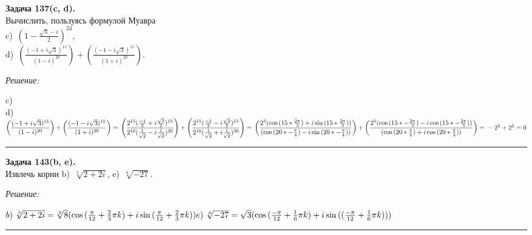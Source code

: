 \documentclass[a4paper, 12pt]{article}
\newenvironment{problem}[2][Задача]
    { \begin{mdframed}[backgroundcolor=gray!10] \textbf{#1 #2.} \\}
    {  \end{mdframed}}
\newenvironment{solution}
    {\textit{Решение: }}
    {\noindent\rule{7in}{1.5pt}}
\begin{document}
\begin{problem}{137(c, d)}
Вычислить, пользуясь формулой Муавра \\
c)~$\left( 1- \displaystyle\frac{\sqrt{3}-i}{2}\right)^{24}$, \\
d)~$\left( \displaystyle\frac{(-1+i\sqrt{3})^{15}}{(1-i)^{20}}\right)+\left( \displaystyle\frac{(-1-i\sqrt{3})^{15}}{(1+i)^{20}}\right)$.
\end{problem}
\begin{solution}

c)~ \\
d)~
$
\left(
  \displaystyle\frac{(-1 + i\sqrt{3})^{15}}{(1 - i)^{20}}
\right) + 
\left(
  \displaystyle\frac{(-1 - i\sqrt{3})^{15}}{(1+i)^{20}}
\right) = \\

\left(
  \displaystyle\frac{2^{15}(\frac{-1}{2} + i\frac{\sqrt{3}}{2})^{15}}{2^{10}(\frac{1}{\sqrt2} - i\frac{1}{\sqrt2})^{20}}
\right) + 
\left(
  \displaystyle\frac{2^{15}(\frac{-1}{2} - i\frac{\sqrt{3}}{2})^{15}}{2^{10}(\frac{1}{\sqrt2} + i\frac{1}{\sqrt2})^{20}}
\right) = \\

\left(
  \displaystyle\frac{2^{5}(\cos{(15*\frac{2\pi}{3})} + i\sin{(15*\frac{2\pi}{3})})}{(\cos{(20*-\frac{\pi}{4})} - i\sin{(20*-\frac{\pi}{4})})}
\right) + 
\left(
  \displaystyle\frac{2^{5}(\cos{(15*-\frac{2\pi}{3})} - i\cos{(15*-\frac{2\pi}{3})})}{(\cos{(20*\frac{\pi}{4})} + i\cos{(20*\frac{\pi}{4})})}
\right) = \\

-2^{5} + 2^{5} = 0
$


\end{solution} 

\begin{problem}{143(b, e)}
Извлечь корни b)~$\sqrt[3]{2+2i}$, e)~$\sqrt[6]{-27}$.
\end{problem}
\begin{solution}

$
b)~\sqrt[3]{2 + 2i} = \sqrt[6]{8}(\cos{(\frac{\pi}{12} + \frac{2}{3}\pi k)} + i\sin{(\frac{\pi}{12} + \frac{2}{3}\pi k)})
\\
e)~\sqrt[6]{-27} = \sqrt3(\cos{(\frac{-\pi}{12} + \frac{1}{6}\pi k)} + i\sin{((\frac{-\pi}{12} + \frac{1}{6}\pi k))})
$

\end{solution} 
\end{document}
